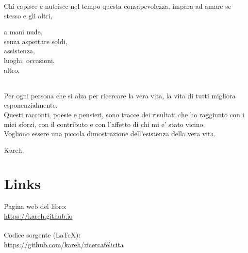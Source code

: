 Chi capisce e nutrisce nel tempo questa consapevolezza, impara ad amare se stesso e gli altri,

\begin{poem}
a mani nude,\\
senza aspettare soldi,\\
assistenza,\\
luoghi, occasioni,\\
altro.\\
\end{poem}

\leavevmode\\
Per ogni persona che si alza per ricercare la vera vita,
la vita di tutti migliora esponenzialmente.\\

Questi racconti, poesie e pensieri, sono tracce dei risultati che ho raggiunto con i miei sforzi, con il contributo e con l'affetto di chi mi e' stato vicino.\\
Vogliono essere una piccola dimostrazione dell'esistenza della vera vita.

\begin{flushright}
    \vspace*{\fill}
    Kareh, \finishDate
\end{flushright}


\section{Links}

Pagina web del libro:\\
\url{https://kareh.github.io}\\

\leavevmode\\
Codice sorgente (LaTeX):\\
\url{https://github.com/kareh/ricercafelicita}

